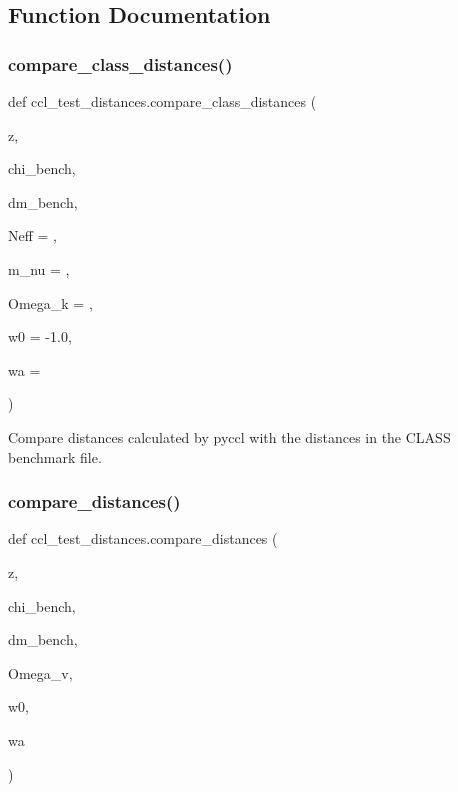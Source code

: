 \subsection{Function Documentation}
\mbox{\label{namespaceccl__test__distances_a2b5f40d54cab3c37be15ab14f8c855dc}} 
\subsubsection{\texorpdfstring{compare\+\_\+class\+\_\+distances()}{compare\_class\_distances()}}
{\footnotesize\ttfamily def ccl\+\_\+test\+\_\+distances.\+compare\+\_\+class\+\_\+distances (\begin{DoxyParamCaption}\item[{}]{z,  }\item[{}]{chi\+\_\+bench,  }\item[{}]{dm\+\_\+bench,  }\item[{}]{Neff = {},  }\item[{}]{m\+\_\+nu = {},  }\item[{}]{Omega\+\_\+k = {},  }\item[{}]{w0 = {\ttfamily -\/1.0},  }\item[{}]{wa = {} }\end{DoxyParamCaption})}

\begin{DoxyVerb}Compare distances calculated by pyccl with the distances in the CLASS
benchmark file.
\end{DoxyVerb}
 \mbox{\label{namespaceccl__test__distances_ab82b4c6c6e09365fb75f5d938c256534}} 
\subsubsection{\texorpdfstring{compare\+\_\+distances()}{compare\_distances()}}
{\footnotesize\ttfamily def ccl\+\_\+test\+\_\+distances.\+compare\+\_\+distances (\begin{DoxyParamCaption}\item[{}]{z,  }\item[{}]{chi\+\_\+bench,  }\item[{}]{dm\+\_\+bench,  }\item[{}]{Omega\+\_\+v,  }\item[{}]{w0,  }\item[{}]{wa }\end{DoxyParamCaption})}


